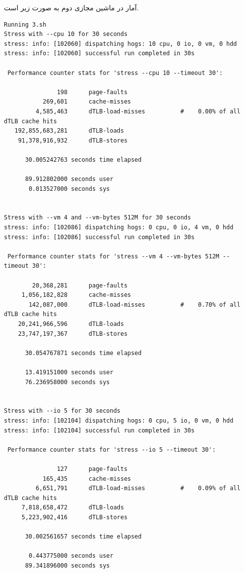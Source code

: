 \documentclass{article}
\begin{document}
آمار در ماشین مجازی دوم به صورت زیر است.
\begin{latin}
\begin{lstlisting}
Running 3.sh
Stress with --cpu 10 for 30 seconds
stress: info: [102060] dispatching hogs: 10 cpu, 0 io, 0 vm, 0 hdd
stress: info: [102060] successful run completed in 30s

 Performance counter stats for 'stress --cpu 10 --timeout 30':

               198      page-faults                                                 
           269,601      cache-misses                                                
         4,585,463      dTLB-load-misses          #    0.00% of all dTLB cache hits 
   192,855,683,281      dTLB-loads                                                  
    91,378,916,932      dTLB-stores                                                 

      30.005242763 seconds time elapsed

      89.912802000 seconds user
       0.013527000 seconds sys


Stress with --vm 4 and --vm-bytes 512M for 30 seconds
stress: info: [102086] dispatching hogs: 0 cpu, 0 io, 4 vm, 0 hdd
stress: info: [102086] successful run completed in 30s

 Performance counter stats for 'stress --vm 4 --vm-bytes 512M --timeout 30':

        20,368,281      page-faults                                                 
     1,056,182,828      cache-misses                                                
       142,087,000      dTLB-load-misses          #    0.70% of all dTLB cache hits 
    20,241,966,596      dTLB-loads                                                  
    23,747,197,367      dTLB-stores                                                 

      30.054767871 seconds time elapsed

      13.419151000 seconds user
      76.236958000 seconds sys


Stress with --io 5 for 30 seconds
stress: info: [102104] dispatching hogs: 0 cpu, 5 io, 0 vm, 0 hdd
stress: info: [102104] successful run completed in 30s

 Performance counter stats for 'stress --io 5 --timeout 30':

               127      page-faults                                                 
           165,435      cache-misses                                                
         6,651,791      dTLB-load-misses          #    0.09% of all dTLB cache hits 
     7,818,658,472      dTLB-loads                                                  
     5,223,902,416      dTLB-stores                                                 

      30.002561657 seconds time elapsed

       0.443775000 seconds user
      89.341896000 seconds sys
\end{lstlisting}
\end{latin}
\end{document}
